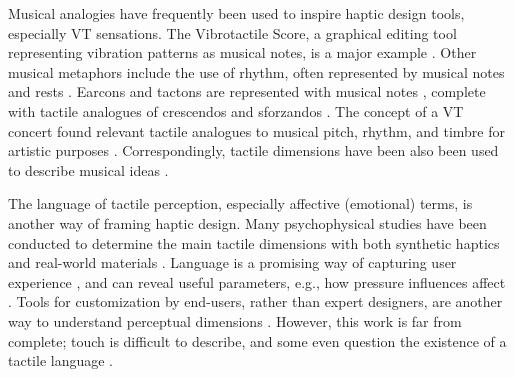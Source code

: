 Musical analogies have frequently been used to inspire haptic design tools, especially VT sensations. %
The Vibrotactile Score, a graphical editing tool representing vibration patterns as musical notes, is a major example \cite{Lee2012, Lee2009}.
Other musical metaphors include the use of rhythm, often represented by musical notes and rests \cite{Ternes2008,Brown2005,Chan2008, Brown2006a}.
Earcons and tactons are represented with musical notes \cite{Brewster1993,Brewster2004}, complete with
tactile analogues of crescendos and sforzandos \cite{Brown2006}.
The concept of a VT concert found relevant tactile analogues to musical pitch, rhythm, and timbre for artistic purposes \cite{Gunther2002}.
Correspondingly, tactile dimensions have been also been used to describe musical ideas \cite{Eitan2010}.


The language of tactile perception, especially affective (emotional) terms, is another way of framing haptic design.
Many psychophysical studies have been conducted to determine the main tactile dimensions with both synthetic haptics and real-world materials  \cite{Enriquez2003,Okamoto2013}.
Language is a promising way of capturing user experience \cite{Obrist2013}, and can reveal useful parameters, e.g., how pressure influences affect \cite{Zheng2012}.
Tools for customization by end-users, rather than expert designers, are another way to understand perceptual dimensions \cite{Seifi2014, Seifi2015}.
However, this work is far from complete; touch is difficult to describe, and some even question the existence of a tactile language \cite{Jansson-Boyd2011}.



%
%
